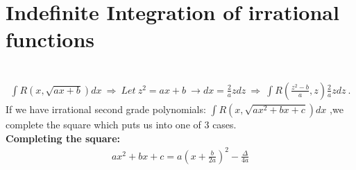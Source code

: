 \documentclass[a4paper]{report}
\begin{document}
\section{Indefinite Integration of irrational functions}
\\
\begin{align*}
    \int R\left ( x,\sqrt{ax + b} \right )dx\ \Rightarrow \ Let\ z^{2}=ax + b\ \rightarrow dx=\frac{2}{a}zdz\ \Rightarrow \ \int R\left ( \frac{z^{2}-b}{a},z \right )\frac{2}{a}zdz\ .
\end{align*}
If we have irrational second grade polynomials:
$\int R\left(x,\sqrt{ax^{2} + bx + c} \right)dx$ 
,we complete the square which puts us
into one of 3 cases.\\
\textbf{Completing the square:}
\begin{align}
    ax^{2} + bx + c = a\left(x+\frac{b}{2a} \right)^{2} - \frac{\varDelta }{4a}  
\end{align}
\end{document}
